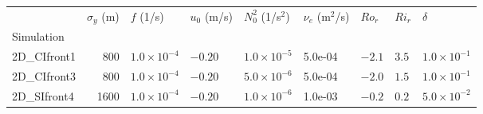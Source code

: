 \begin{tabular}{lrlllllll}
\toprule
{} &  $\sigma_y$ (m) &             $f$ (1/s) & $u_0$ (m/s) &     $N^2_0$ (1/s$^2$) & $\nu_e$ (m$^2$/s) &  $Ro_r$ & $Ri_r$ &              $\delta$ \\
Simulation   &                 &                       &             &                       &                   &         &        &                       \\
\midrule
2D\_CIfront1 &             800 &  $1.0 \times 10^{-4}$ &     $-0.20$ &  $1.0 \times 10^{-5}$ &           5.0e-04 &  $-2.1$ &  $3.5$ &  $1.0 \times 10^{-1}$ \\
2D\_CIfront3 &             800 &  $1.0 \times 10^{-4}$ &     $-0.20$ &  $5.0 \times 10^{-6}$ &           5.0e-04 &  $-2.0$ &  $1.5$ &  $1.0 \times 10^{-1}$ \\
2D\_SIfront4 &            1600 &  $1.0 \times 10^{-4}$ &     $-0.20$ &  $1.0 \times 10^{-6}$ &           1.0e-03 &  $-0.2$ &  $0.2$ &  $5.0 \times 10^{-2}$ \\
\bottomrule
\end{tabular}
